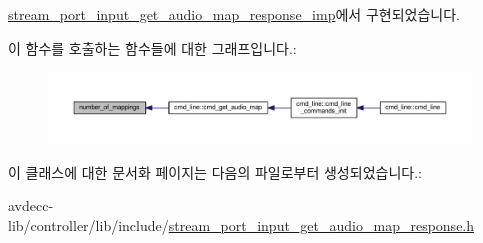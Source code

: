 \hyperlink{classavdecc__lib_1_1stream__port__input__get__audio__map__response__imp_a3928eb3903b4e082cbc7d6d29146aabd}{stream\+\_\+port\+\_\+input\+\_\+get\+\_\+audio\+\_\+map\+\_\+response\+\_\+imp}에서 구현되었습니다.



이 함수를 호출하는 함수들에 대한 그래프입니다.\+:
\nopagebreak
\begin{figure}[H]
\begin{center}
\leavevmode
\includegraphics[width=350pt]{classavdecc__lib_1_1stream__port__input__get__audio__map__response_a7f2372b5389cf9ba04675f3ef37439f3_icgraph}
\end{center}
\end{figure}




이 클래스에 대한 문서화 페이지는 다음의 파일로부터 생성되었습니다.\+:\begin{DoxyCompactItemize}
\item 
avdecc-\/lib/controller/lib/include/\hyperlink{stream__port__input__get__audio__map__response_8h}{stream\+\_\+port\+\_\+input\+\_\+get\+\_\+audio\+\_\+map\+\_\+response.\+h}\end{DoxyCompactItemize}
